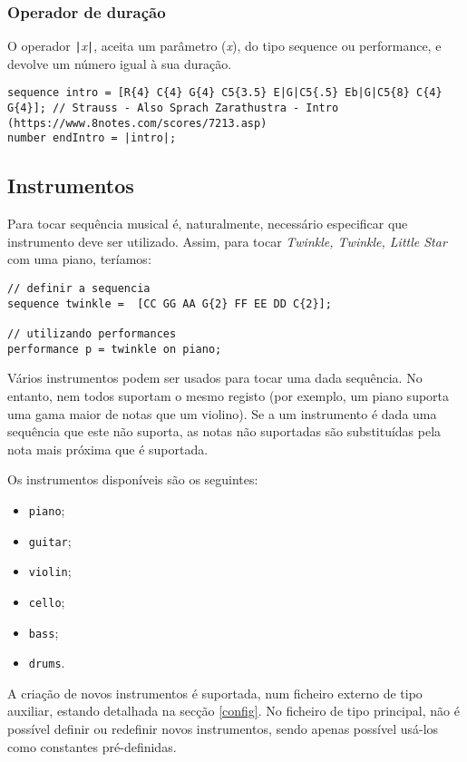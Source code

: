 \documentclass{article}
\begin{document}
\subsubsection{Operador de duração}
O operador \texttt{|}\textit{x}\texttt{|}, aceita um parâmetro (\textit{x}), do tipo sequence ou performance, e devolve um número igual à sua duração.
\begin{lstlisting} 
sequence intro = [R{4} C{4} G{4} C5{3.5} E|G|C5{.5} Eb|G|C5{8} C{4} G{4}]; // Strauss - Also Sprach Zarathustra - Intro (https://www.8notes.com/scores/7213.asp)
number endIntro = |intro|;
\end{lstlisting}

\subsection{Instrumentos}
Para tocar sequência musical é, naturalmente, necessário especificar que instrumento deve ser utilizado. Assim, para tocar \textit{Twinkle, Twinkle, Little Star} com uma piano, teríamos:
\begin{lstlisting} 
// definir a sequencia
sequence twinkle =  [CC GG AA G{2} FF EE DD C{2}];

// utilizando performances
performance p = twinkle on piano;
\end{lstlisting}

Vários instrumentos podem ser usados para tocar uma dada sequência. No entanto, nem todos suportam o mesmo registo (por exemplo, um piano suporta uma gama maior de notas que um violino). Se a um instrumento é dada uma sequência que este não suporta, as notas não suportadas são substituídas pela nota mais próxima que é suportada. %

Os instrumentos disponíveis são os seguintes:
\begin{itemize}
    \item \texttt{piano};
    \item \texttt{guitar};
    \item \texttt{violin};
    \item \texttt{cello};
    \item \texttt{bass};
    \item \texttt{drums}.
\end{itemize}
A criação de novos instrumentos é suportada, num ficheiro externo de tipo auxiliar, estando detalhada na secção \ref{config}. No ficheiro de tipo principal, não é possível definir ou redefinir novos instrumentos, sendo apenas possível usá-los como constantes pré-definidas.
\end{document}
